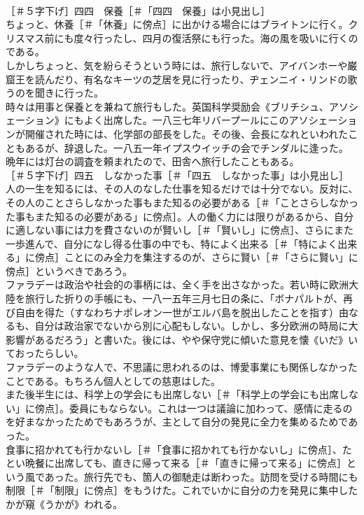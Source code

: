 \documentclass[8pt]{extreport}
\begin{document}
\begin{CJK}{UTF8}{min}
\\	［＃５字下げ］四四　保養［＃「四四　保養」は小見出し］
\\	ちょっと、休養［＃「休養」に傍点］に出かける場合にはブライトンに行く。クリスマス前にも度々行ったし、四月の復活祭にも行った。海の風を吸いに行くのである。
\\	しかしちょっと、気を紛らそうという時には、旅行しないで、アイバンホーや巌窟王を読んだり、有名なキーツの芝居を見に行ったり、ヂェンニイ・リンドの歌うのを聞きに行った。
\\	時々は用事と保養とを兼ねて旅行もした。英国科学奨励会《ブリチシュ、アソシェーション》にもよく出席した。一八三七年リバープールにこのアソシェーションが開催された時には、化学部の部長をした。その後、会長になれといわれたこともあるが、辞退した。一八五一年イプスウイッチの会でチンダルに逢った。
\\	晩年には灯台の調査を頼まれたので、田舎へ旅行したこともある。
\\	［＃５字下げ］四五　しなかった事［＃「四五　しなかった事」は小見出し］
\\	人の一生を知るには、その人のなした仕事を知るだけでは十分でない。反対に、その人のことさらしなかった事もまた知るの必要がある［＃「ことさらしなかった事もまた知るの必要がある」に傍点］。人の働く力には限りがあるから、自分に適しない事には力を費さないのが賢いし［＃「賢いし」に傍点］、さらにまた一歩進んで、自分になし得る仕事の中でも、特によく出来る［＃「特によく出来る」に傍点］ことにのみ全力を集注するのが、さらに賢い［＃「さらに賢い」に傍点］というべきであろう。
\\	ファラデーは政治や社会的の事柄には、全く手を出さなかった。若い時に欧洲大陸を旅行した折りの手帳にも、一八一五年三月七日の条に、「ボナパルトが、再び自由を得た（すなわちナポレオン一世がエルバ島を脱出したことを指す）由なるも、自分は政治家でないから別に心配もしない。しかし、多分欧洲の時局に大影響があるだろう」と書いた。後には、やや保守党に傾いた意見を懐《いだ》いておったらしい。
\\	ファラデーのような人で、不思議に思われるのは、博愛事業にも関係しなかったことである。もちろん個人としての慈恵はした。
\\	また後半生には、科学上の学会にも出席しない［＃「科学上の学会にも出席しない」に傍点］。委員にもならない。これは一つは議論に加わって、感情に走るのを好まなかったためでもあろうが、主として自分の発見に全力を集めるためであった。
\\	食事に招かれても行かないし［＃「食事に招かれても行かないし」に傍点］、たとい晩餐に出席しても、直きに帰って来る［＃「直きに帰って来る」に傍点］という風であった。旅行先でも、箇人の御馳走は断わった。訪問を受ける時間にも制限［＃「制限」に傍点］をもうけた。これでいかに自分の力を発見に集中したかが窺《うかが》われる。

\end{CJK}
\end{document}
